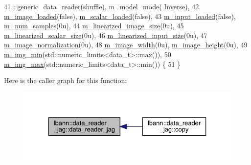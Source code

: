 \begin{DoxyCode}
41   : \hyperlink{classlbann_1_1generic__data__reader_aaba933b8f7c1227801f6e80d39986af4}{generic\_data\_reader}(shuffle), \hyperlink{classlbann_1_1data__reader__jag_a877eb1f0eb2afccd73cd7d69407ff6e2}{m\_model\_mode}(
      \hyperlink{classlbann_1_1data__reader__jag_a114c369c8604df385cf7a3ec20c9739ba2d3bba9f202270762169c1c01d2fb7a4}{Inverse}),
42     \hyperlink{classlbann_1_1data__reader__jag_a3f1691818996f73dc918dfd0e8f98a70}{m\_image\_loaded}(\textcolor{keyword}{false}), \hyperlink{classlbann_1_1data__reader__jag_add9f037609b73da931a4a8a460798db9}{m\_scalar\_loaded}(\textcolor{keyword}{false}),
43     \hyperlink{classlbann_1_1data__reader__jag_ae047bbae82c4a8eceedceeea2e1815ad}{m\_input\_loaded}(\textcolor{keyword}{false}), \hyperlink{classlbann_1_1data__reader__jag_a25ceffff7e8d6641e785efa033530011}{m\_num\_samples}(0u),
44     \hyperlink{classlbann_1_1data__reader__jag_a7c2aa5f489e7c7a3236c1f6c4a760048}{m\_linearized\_image\_size}(0u),
45     \hyperlink{classlbann_1_1data__reader__jag_a856b4b9cdf9d8569e5fef1d5d996870d}{m\_linearized\_scalar\_size}(0u),
46     \hyperlink{classlbann_1_1data__reader__jag_a75e3c8870f9fc8e50fb24e4515ac7d82}{m\_linearized\_input\_size}(0u),
47     \hyperlink{classlbann_1_1data__reader__jag_a351fe7aaccf8456fa97c9d9bf3dcd73d}{m\_image\_normalization}(0u),
48     \hyperlink{classlbann_1_1data__reader__jag_a193a91f2aab9f6373a7b376ff183cd0e}{m\_image\_width}(0u), \hyperlink{classlbann_1_1data__reader__jag_a6178d5dffd5e9bf7cf5703613cf9bd2e}{m\_image\_height}(0u),
49     \hyperlink{classlbann_1_1data__reader__jag_a273907a834d9bd234b21f88ee72076be}{m\_img\_min}(std::numeric\_limits<data\_t>::max()), 
50     \hyperlink{classlbann_1_1data__reader__jag_ab71122303357978ff1de2e2c1d1ac0ed}{m\_img\_max}(std::numeric\_limits<data\_t>::min()) \{
51 \}
\end{DoxyCode}
Here is the caller graph for this function\+:\nopagebreak
\begin{figure}[H]
\begin{center}
\leavevmode
\includegraphics[width=329pt]{classlbann_1_1data__reader__jag_a8729a52155d4a4319efb77b1b38bc369_icgraph}
\end{center}
\end{figure}
\mbox{\label{classlbann_1_1data__reader__jag_a4cd27646dcb8ccacd3ef370db5859a00}} 
